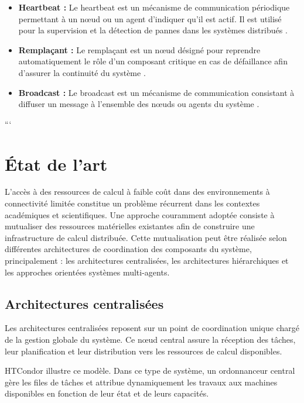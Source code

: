 \documentclass[12pt,a4paper]{report}
\begin{document}
\begin{itemize}
    \item[$\bullet$] \textbf{Heartbeat :} Le heartbeat est un mécanisme de communication périodique permettant à un nœud ou un agent d’indiquer qu’il est actif. Il est utilisé pour la supervision et la détection de pannes dans les systèmes distribués \cite{tanenbaum_ds, kubernetes}.

    \item[$\bullet$] \textbf{Remplaçant :} Le remplaçant est un nœud désigné pour reprendre automatiquement le rôle d’un composant critique en cas de défaillance afin d’assurer la continuité du système \cite{bully}.

    \item[$\bullet$] \textbf{Broadcast :} Le broadcast est un mécanisme de communication consistant à diffuser un message à l’ensemble des nœuds ou agents du système \cite{tanenbaum_ds}.

\end{itemize}
```


\section{État de l'art}

L'accès à des ressources de calcul à faible coût dans des environnements à connectivité limitée constitue un problème récurrent dans les contextes académiques et scientifiques. Une approche couramment adoptée consiste à mutualiser des ressources matérielles existantes afin de construire une infrastructure de calcul distribuée. Cette mutualisation peut être réalisée selon différentes architectures de coordination des composants du système, principalement : les architectures centralisées, les architectures hiérarchiques et les approches orientées systèmes multi-agents.

\subsection{Architectures centralisées}

Les architectures centralisées reposent sur un point de coordination unique chargé de la gestion globale du système. Ce nœud central assure la réception des tâches, leur planification et leur distribution vers les ressources de calcul disponibles.

HTCondor illustre ce modèle. Dans ce type de système, un ordonnanceur central gère les files de tâches et attribue dynamiquement les travaux aux machines disponibles en fonction de leur état et de leurs capacités.
\end{document}
